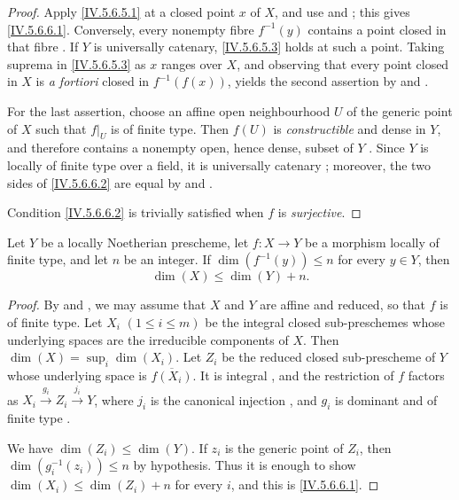 \begin{proof}
Apply \eqref{IV.5.6.5.1} at a closed point $x$ of $X$, and use
 and ; this gives
\eqref{IV.5.6.6.1}.  Conversely, every nonempty fibre $f^{-1}(y)$
contains a point closed in that fibre .  If $Y$ is
universally catenary, \eqref{IV.5.6.5.3} holds at such a point.
Taking suprema in \eqref{IV.5.6.5.3} as $x$ ranges over $X$, and
observing that every point closed in $X$ is \emph{a fortiori} closed
in $f^{-1}(f(x))$, yields the second assertion by
 and .

For the last assertion, choose an affine open neighbourhood $U$ of
the generic point of $X$ such that $f|_U$ is of finite type.  Then
$f(U)$ is \emph{constructible}  and dense in $Y$, and
therefore contains a nonempty open, hence dense, subset of $Y$
.  Since $Y$ is locally of finite type over a
field, it is universally catenary ; moreover, the two
sides of \eqref{IV.5.6.6.2} are equal by
 and .

Condition \eqref{IV.5.6.6.2} is trivially satisfied when $f$ is
\emph{surjective}.
\end{proof}

\begin{corollary}[5.6.7]
\label{IV.5.6.7}
Let $Y$ be a locally Noetherian prescheme, let $f:X\to Y$ be a
morphism locally of finite type, and let $n$ be an integer.  If $\dim(f^{-1}(y))\leq n$
for every $y\in Y$, then
\begin{equation}
\dim(X)\leq\dim(Y)+n.
\tag{5.6.7.1}\label{IV.5.6.7.1}
\end{equation}
\end{corollary}

\begin{proof}
By  and , we may assume that $X$
and $Y$ are affine and reduced, so that $f$ is of finite type.
Let $X_i$ $(1\leq i\leq m)$ be the integral closed sub-preschemes
whose underlying spaces are the irreducible components of $X$.
Then $\dim(X)=\sup_i\dim(X_i)$.
Let $Z_i$ be the reduced closed sub-prescheme of $Y$ whose
underlying space is $\overline{f(X_i)}$.  It is integral
, and the restriction of $f$ factors as $X_i\xrightarrow{g_i}Z_i\xrightarrow{j_i}Y$,
where $j_i$ is the canonical injection , and $g_i$
is dominant and of finite type .


We have $\dim(Z_i)\leq\dim(Y)$.  If $z_i$ is the generic point
of $Z_i$, then $\dim(g_i^{-1}(z_i))\leq n$
by hypothesis.  Thus it is enough to show $\dim(X_i)\leq\dim(Z_i)+n$
for every $i$, and this is \eqref{IV.5.6.6.1}.
\end{proof}

